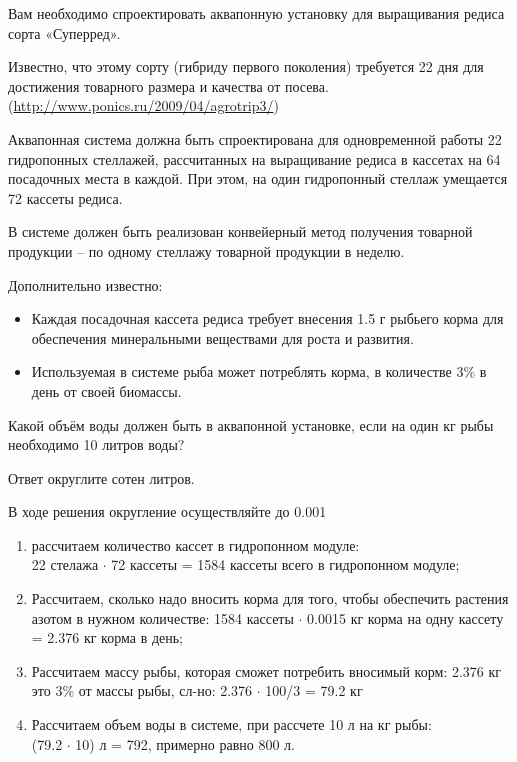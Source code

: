 
Вам необходимо спроектировать аквапонную установку для выращивания редиса сорта  «Суперред».

Известно, что этому сорту (гибриду первого поколения) требуется  22 дня  для достижения товарного размера и качества от посева.  (\url{http://www.ponics.ru/2009/04/agrotrip3/})

Аквапонная система должна быть спроектирована для одновременной работы 22 гидропонных стеллажей, рассчитанных на выращивание редиса в кассетах на 64 посадочных места в каждой. При этом, на один гидропонный стеллаж умещается 72 кассеты редиса.

В системе должен быть реализован конвейерный метод получения товарной продукции – по одному стеллажу товарной продукции в неделю.

Дополнительно известно:

\begin{itemize}
    \item Каждая посадочная кассета редиса требует внесения  1.5 г рыбьего корма для обеспечения минеральными веществами для роста и развития.
    \item Используемая в системе рыба может потреблять корма, в количестве $3\%$ в день от своей биомассы.
\end{itemize}

Какой объём воды должен быть в аквапонной установке, если на один кг рыбы необходимо 10 литров воды?

Ответ округлите сотен литров.

В ходе решения округление осуществляйте до 0.001

\solutionSection

\begin{enumerate}
    \item рассчитаем количество кассет в гидропонном модуле: \\
    22 стелажа $\cdot$ 72 кассеты = 1584 кассеты всего в гидропонном модуле;
    \item Рассчитаем, сколько надо вносить корма для того, чтобы обеспечить растения азотом в нужном количестве:
    1584 кассеты $\cdot$  0.0015 кг корма на одну кассету = 2.376 кг корма в день;
    \item Рассчитаем массу рыбы, которая сможет потребить вносимый корм:
    2.376 кг это 3\% от массы рыбы, сл-но: 2.376 $\cdot$ 100/3 = 79.2 кг
    \item Рассчитаем объем воды в системе, при рассчете 10 л на кг рыбы: \\
    (79.2 $\cdot$ 10) л = 792, примерно равно 800 л.
\end{enumerate}
